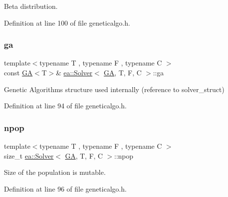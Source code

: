 Beta distribution. 



Definition at line 100 of file geneticalgo.\+h.

\mbox{\label{classea_1_1_solver_3_01_g_a_00_01_t_00_01_f_00_01_c_01_4_a5e56c4d15894af96c2be5fcaec7d14fb}} 
\subsubsection{\texorpdfstring{ga}{ga}}
{\footnotesize\ttfamily template$<$typename T , typename F , typename C $>$ \\
const \hyperlink{structea_1_1_g_a}{GA}$<$T$>$\& \hyperlink{classea_1_1_solver}{ea\+::\+Solver}$<$ \hyperlink{structea_1_1_g_a}{GA}, T, F, C $>$\+::ga\hspace{0.3cm}{\ttfamily [private]}}



Genetic Algorithms structure used internally (reference to solver\+\_\+struct) 



Definition at line 94 of file geneticalgo.\+h.

\mbox{\label{classea_1_1_solver_3_01_g_a_00_01_t_00_01_f_00_01_c_01_4_a805f49211363542de6984c7fd2c97c9c}} 
\subsubsection{\texorpdfstring{npop}{npop}}
{\footnotesize\ttfamily template$<$typename T , typename F , typename C $>$ \\
size\+\_\+t \hyperlink{classea_1_1_solver}{ea\+::\+Solver}$<$ \hyperlink{structea_1_1_g_a}{GA}, T, F, C $>$\+::npop\hspace{0.3cm}{\ttfamily [private]}}



Size of the population is mutable. 



Definition at line 96 of file geneticalgo.\+h.

